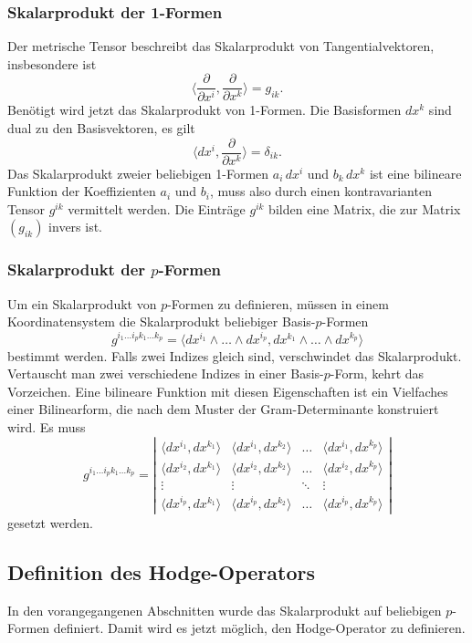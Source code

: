 %
%
\subsubsection{Skalarprodukt der 1-Formen}
Der metrische Tensor beschreibt das Skalarprodukt von Tangentialvektoren,
insbesondere ist
\[
\biggl\langle
\frac{\partial}{\partial x^i},\frac{\partial}{\partial x^k}
\biggr\rangle
=
g_{ik}.
\]
Benötigt wird jetzt das Skalarprodukt von 1-Formen.
Die Basisformen $dx^k$ sind dual zu den Basisvektoren, es gilt
\[
\biggl\langle dx^i,\frac{\partial}{\partial x^k}\biggr\rangle
=
\delta_{ik}.
\]
Das Skalarprodukt zweier beliebigen 1-Formen $a_i\,dx^i$ und
$b_k\,dx^k$ ist eine bilineare Funktion der Koeffizienten
$a_i$ und $b_i$, muss also durch einen kontravarianten 
Tensor $g^{ik}$ vermittelt werden.
Die Einträge $g^{ik}$ bilden eine Matrix, die zur Matrix $(g_{ik})$
invers ist.

%
%
\subsubsection{Skalarprodukt der $p$-Formen}
Um ein Skalarprodukt von $p$-Formen zu definieren, müssen in einem
Koordinatensystem die Skalarprodukt beliebiger Basis-$p$-Formen
\[
g^{i_1\dots i_pk_1\dots k_p}
=
\langle
dx^{i_1}\wedge\dots\wedge dx^{i_p}
,
dx^{k_1}\wedge\dots\wedge dx^{k_p}
\rangle
\]
bestimmt werden.
Falls zwei Indizes gleich sind, verschwindet das Skalarprodukt.
Vertauscht man zwei verschiedene Indizes in einer Basis-$p$-Form,
kehrt das Vorzeichen.
Eine bilineare Funktion mit diesen Eigenschaften ist ein Vielfaches
einer Bilinearform, die nach dem Muster der Gram-Determinante 
konstruiert wird.
Es muss
\[
g^{i_1\dots i_pk_1\dots k_p}
=
\left|
\begin{matrix}
\langle dx^{i_1}, dx^{k_1} \rangle
	&\langle dx^{i_1}, dx^{k_2} \rangle
	&\dots
	&\langle dx^{i_1}, dx^{k_p} \rangle
\\
\langle dx^{i_2}, dx^{k_1} \rangle
	&\langle dx^{i_2}, dx^{k_2} \rangle
	&\dots
	&\langle dx^{i_2}, dx^{k_p} \rangle
\\[-2pt]
\vdots
	&\vdots
	&\ddots
	&\vdots
\\
\langle dx^{i_p}, dx^{k_1} \rangle
	&\langle dx^{i_p}, dx^{k_2} \rangle
	&\dots
	&\langle dx^{i_p}, dx^{k_p} \rangle
\end{matrix}
\right|
\]
gesetzt werden.

%
%
\subsection{Definition des Hodge-Operators}
In den vorangegangenen Abschnitten wurde das Skalarprodukt auf
beliebigen $p$-Formen definiert.
Damit wird es jetzt möglich, den Hodge-Operator zu definieren.

